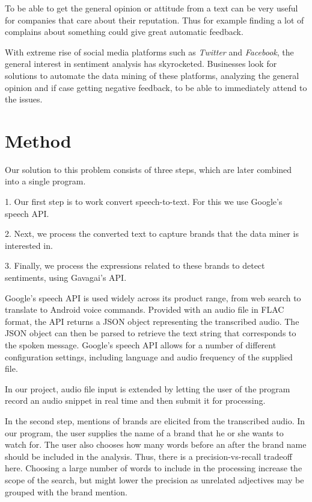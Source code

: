 \documentclass[a4paper,12pt,twoside]{ltxdoc}
\begin{document}
To be able to get the general opinion or attitude from a text can be very useful for companies that care about their reputation.
Thus for example finding a lot of complains about something could give great automatic feedback.

With extreme rise of social media platforms such as \emph{Twitter} and \emph{Facebook}, the general interest in sentiment analysis has skyrocketed. Businesses look for solutions to automate the data mining of these platforms, analyzing the general opinion and if case getting negative feedback, to be able to immediately attend to the issues.

\section{Method}

Our solution to this problem consists of three steps, which are later combined into a single program.

1. Our first step is to work convert speech-to-text. For this we use Google's speech API.

2. Next, we process the converted text to capture brands that the data miner is interested in.

3. Finally, we process the expressions related to these brands to detect sentiments, using Gavagai's API.

Google's speech API is used widely across its product range, from web search to translate to Android voice commands.
Provided with an audio file in FLAC format, the API returns a JSON object representing the transcribed audio. The JSON object
can then be parsed to retrieve the text string that corresponds to the spoken message. Google's speech API allows for a number
of different configuration settings, including language and audio frequency of the supplied file.

In our project, audio file input is extended by letting the user of the program record an audio snippet in real time and
then submit it for processing.

In the second step, mentions of brands are elicited from the transcribed audio. In our program, the user supplies the name
of a brand that he or she wants to watch for. The user also chooses how many words before an after the brand name should
be included in the analysis. Thus, there is a precision-vs-recall tradeoff here. Choosing a large number of words to include
in the processing increase the scope of the search, but might lower the precision as unrelated adjectives may be grouped
with the brand mention.
\end{document}
